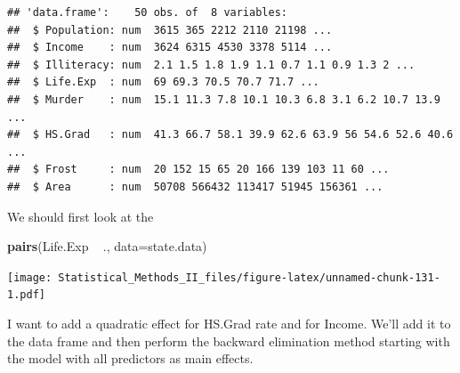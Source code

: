 \documentclass[]{book}
\newenvironment{Shaded}{\begin{snugshade}}{\end{snugshade}}
\newcommand{\KeywordTok}[1]{\textcolor[rgb]{0.13,0.29,0.53}{\textbf{{#1}}}}
\newcommand{\DataTypeTok}[1]{\textcolor[rgb]{0.13,0.29,0.53}{{#1}}}
\newcommand{\DecValTok}[1]{\textcolor[rgb]{0.00,0.00,0.81}{{#1}}}
\newcommand{\FloatTok}[1]{\textcolor[rgb]{0.00,0.00,0.81}{{#1}}}
\newcommand{\StringTok}[1]{\textcolor[rgb]{0.31,0.60,0.02}{{#1}}}
\newcommand{\CommentTok}[1]{\textcolor[rgb]{0.56,0.35,0.01}{\textit{{#1}}}}
\newcommand{\NormalTok}[1]{{#1}}
\theoremstyle{definition}
\theoremstyle{definition}
\theoremstyle{remark}
\begin{document}
\begin{verbatim}
## 'data.frame':    50 obs. of  8 variables:
##  $ Population: num  3615 365 2212 2110 21198 ...
##  $ Income    : num  3624 6315 4530 3378 5114 ...
##  $ Illiteracy: num  2.1 1.5 1.8 1.9 1.1 0.7 1.1 0.9 1.3 2 ...
##  $ Life.Exp  : num  69 69.3 70.5 70.7 71.7 ...
##  $ Murder    : num  15.1 11.3 7.8 10.1 10.3 6.8 3.1 6.2 10.7 13.9 ...
##  $ HS.Grad   : num  41.3 66.7 58.1 39.9 62.6 63.9 56 54.6 52.6 40.6 ...
##  $ Frost     : num  20 152 15 65 20 166 139 103 11 60 ...
##  $ Area      : num  50708 566432 113417 51945 156361 ...
\end{verbatim}

We should first look at the

\begin{Shaded}
\begin{Highlighting}[]
\KeywordTok{pairs}\NormalTok{(Life.Exp ~}\StringTok{ }\NormalTok{., }\DataTypeTok{data=}\NormalTok{state.data)}
\end{Highlighting}
\end{Shaded}

\texttt{[image: Statistical\_Methods\_II\_files/figure-latex/unnamed-chunk-131-1.pdf]}

I want to add a quadratic effect for HS.Grad rate and for Income. We'll
add it to the data frame and then perform the backward elimination
method starting with the model with all predictors as main effects.

\begin{Shaded}
\end{Shaded}
\end{document}
